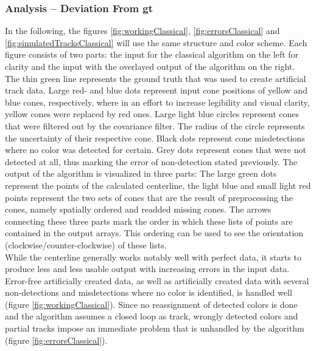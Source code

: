 \subsubsection{Analysis – Deviation From \ac{gt}}
In the following, the figures \ref{fig:workingClassical}, \ref{fig:errorsClassical} and \ref{fig:simulatedTracksClassical} will use the same structure and color scheme. Each figure consists of two parts: the input for the classical algorithm on the left for clarity and the input with the overlayed output of the algorithm on the right. The thin green line represents the ground truth that was used to create artificial track data. Large red- and blue dots represent input cone positions of yellow and blue cones, respectively, where in an effort to increase legibility and visual clarity, yellow cones were replaced by red ones. Large light blue circles represent cones that were filtered out by the covariance filter. The radius of the circle represents the uncertainty of their respective cone. Black dots represent cone misdetections where no color was detected for certain. Grey dots represent cones that were not detected at all, thus marking the error of non-detection stated previously. The output of the algorithm is visualized in three parts: The large green dots represent the points of the calculated centerline, the light blue and small light red points represent the two sets of cones that are the result of preprocessing the cones, namely spatially ordered and readded missing cones. The arrows connecting these three parts mark the order in which these lists of points are contained in the output arrays. This ordering can be used to see the orientation (clockwise/counter-clockwise) of these lists. 
\\
While the centerline generally works notably well with perfect data, it starts to produce less and less usable output with increasing errors in the input data. Error-free artificially created data, as well as artificially created data with several non-detections and misdetections where no color is identified, is handled well (figure \ref{fig:workingClassical}). Since no reassignment of detected colors is done and the algorithm assumes a closed loop as track, wrongly detected colors and partial tracks impose an immediate problem that is unhandled by the algorithm (figure \ref{fig:errorsClassical}).
